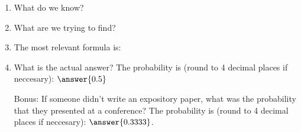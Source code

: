\documentclass{ximera}
\begin{document}
 \begin{enumerate}
\item What do we know?

\begin{selectAll}
\end{selectAll}

\item What are we trying to find?

\begin{multipleChoice}




\end{multipleChoice}

\item The most relevant formula is:

\begin{multipleChoice}
\end{multipleChoice}

\item What is the actual answer?  The probability is (round to 4 decimal places if neccesary): $\answer{0.5}$

\item[Bonus:] If someone didn't write an expository paper, what was the probability that they presented at a conference?  The probability is (round to 4 decimal places if neccesary): $\answer{0.3333}$.

\end{enumerate}

 
 
 
 
      
\end{document}
